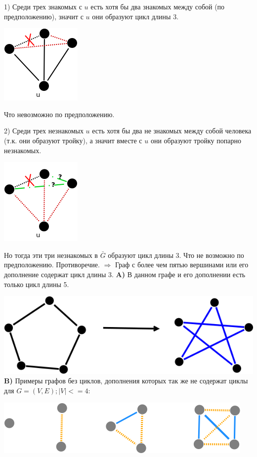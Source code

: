 \documentclass{article}
\begin{document}
1) Среди трех знакомых с $u$ есть хотя бы два знакомых между собой (по предположению), значит с  $u$ они образуют цикл длины 3.
 
\includegraphics[scale=0.5]{6_2.png}

Что невозможно по предположению.

2) Среди трех незнакомых $u$ есть хотя бы два не знакомых между собой человека (т.к. они образуют тройку), а значит вместе с $u$ они образуют тройку попарно незнакомых.

\includegraphics[scale=0.5]{6_3.png}

Но тогда эти три незнакомых в $\bar{G}$ образуют цикл длины 3.
Что не возможно по предположению.
Противоречие. $\Rightarrow$ Граф с более чем пятью вершинами или его дополнение содержат цикл длины 3.
\newpage
\textbf{A)} В данном графе и его дополнении есть только цикл длины 5.

\includegraphics[scale=0.5]{6_4.png}
\\
\textbf{B)} Примеры графов без циклов, дополнения которых так же не содержат циклы для $G = (V, E); |V| <= 4 $:

\includegraphics[scale=0.5]{6_5.png}
\end{document}
